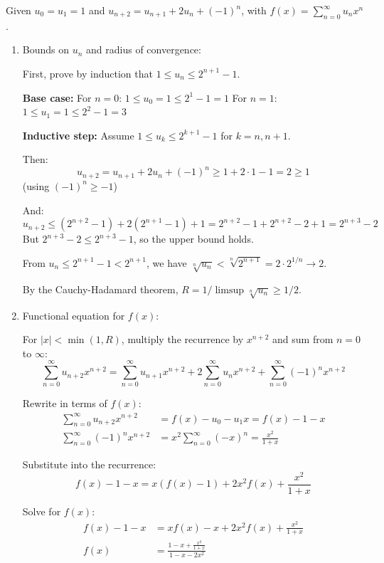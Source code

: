 \documentclass[12pt]{article}
\begin{document}
\begin{answerbox}
Given $u_0 = u_1 = 1$ and $u_{n+2} = u_{n+1} + 2u_n + (-1)^n$, with $f(x) = \sum_{n=0}^{\infty} u_n x^n$.

\begin{enumerate}
    \item Bounds on $u_n$ and radius of convergence:
    
    First, prove by induction that $1 \leq u_n \leq 2^{n+1} - 1$.
    
    \textbf{Base case:} For $n=0$: $1 \leq u_0 = 1 \leq 2^{1} - 1 = 1$ 
    For $n=1$: $1 \leq u_1 = 1 \leq 2^{2} - 1 = 3$ 
    
    \textbf{Inductive step:} Assume $1 \leq u_k \leq 2^{k+1} - 1$ for $k = n, n+1$.
    
    Then:
    \[
    u_{n+2} = u_{n+1} + 2u_n + (-1)^n \geq 1 + 2\cdot 1 - 1 = 2 \geq 1
    \]
    (using $(-1)^n \geq -1$)
    
    And:
    \[
    u_{n+2} \leq (2^{n+2} - 1) + 2(2^{n+1} - 1) + 1 = 2^{n+2} - 1 + 2^{n+2} - 2 + 1 = 2^{n+3} - 2
    \]
    But $2^{n+3} - 2 \leq 2^{n+3} - 1$, so the upper bound holds.
    
    From $u_n \leq 2^{n+1} - 1 < 2^{n+1}$, we have $\sqrt[n]{u_n} < \sqrt[n]{2^{n+1}} = 2 \cdot 2^{1/n} \to 2$.
    
    By the Cauchy-Hadamard theorem, $R = 1/\limsup \sqrt[n]{u_n} \geq 1/2$.
    
    \item Functional equation for $f(x)$:
    
    For $|x| < \min(1, R)$, multiply the recurrence by $x^{n+2}$ and sum from $n=0$ to $\infty$:
    \[
    \sum_{n=0}^{\infty} u_{n+2} x^{n+2} = \sum_{n=0}^{\infty} u_{n+1} x^{n+2} + 2\sum_{n=0}^{\infty} u_n x^{n+2} + \sum_{n=0}^{\infty} (-1)^n x^{n+2}
    \]
    
    Rewrite in terms of $f(x)$:
    \begin{align*}
    \sum_{n=0}^{\infty} u_{n+2} x^{n+2} &= f(x) - u_0 - u_1 x = f(x) - 1 - x \\
    \sum_{n=0}^{\infty} (-1)^n x^{n+2} &= x^2 \sum_{n=0}^{\infty} (-x)^n = \frac{x^2}{1+x}
    \end{align*}
    
    Substitute into the recurrence:
    \[
    f(x) - 1 - x = x(f(x) - 1) + 2x^2 f(x) + \frac{x^2}{1+x}
    \]
    
    Solve for $f(x)$:
    \begin{align*}
    f(x) - 1 - x &= xf(x) - x + 2x^2 f(x) + \frac{x^2}{1+x} \\
    f(x) &= \frac{1 - x + \frac{x^2}{1+x}}{1 - x - 2x^2}
    \end{align*}
    

\end{enumerate}
\end{answerbox}
\end{document}
